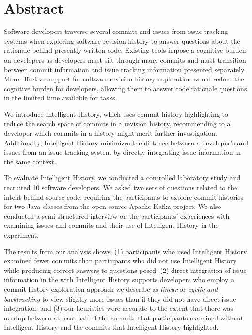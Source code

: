 
\chapter{Abstract}


Software developers traverse several commits and issues from issue tracking systems 
when exploring software revision history to answer questions about the rationale behind presently written code.
Existing tools impose a cognitive burden on developers as developers 
must sift through many commits and must transition between commit information 
and issue tracking information presented separately.
More effective support for software revision history exploration would 
reduce the cognitive burden for developers, allowing them to answer code 
rationale questions in the limited time available for tasks.

We introduce Intelligent History, which uses commit history highlighting to reduce the search space of 
commits in a revision history, recommending to a developer which commits in a history might merit further investigation.
Additionally, Intelligent History minimizes the distance between a developer's  and issues from an issue tracking system
by directly integrating issue information in the same context.

To evaluate Intelligent History, we conducted a controlled laboratory study and recruited 10 software developers.
We asked two sets of questions related to the intent behind source code, requiring the participants to explore 
commit histories for two Java classes from the open-source Apache Kafka project.
We also conducted a semi-structured interview on the participants' experiences with examining issues and commits 
and their use of Intelligent History in the experiment.

The results from our analysis shows:
(1) participants who used Intelligent History examined
fewer commits than participants who did not use Intelligent History
while producing correct answers to questions posed;
(2) direct integration of issue information in the 
with Intelligent History supports developers who employ a commit history exploration approach
we describe as \textit{linear} or \textit{cyclic and backtracking} to view slightly more issues than if they did not have
direct issue integration; and
(3) our heuristics were accurate to the extent that there was overlap between at least half of the commits
that participants examined without Intelligent History and the commits that Intelligent History
highlighted.

